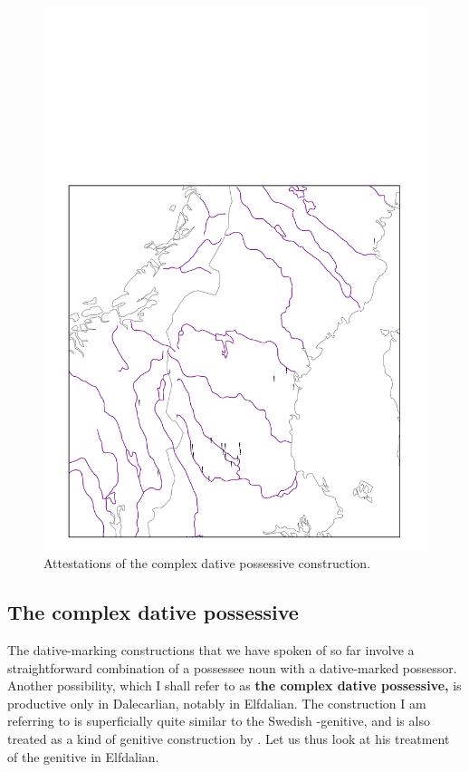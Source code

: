 {\begin{figure}[h]
\includegraphics[height=.3\textheight]{figures/23_Attestationsofthecomplex}
\caption{Attestations of the complex dative possessive construction.}
\label{map:19}

\end{figure}

\subsection{The complex dative possessive}
\label{sec:5.4.2}

The dative-marking constructions that we have spoken of so far involve a straightforward combination of a possessee noun with a dative-marked possessor. Another possibility, which I shall refer to as \textbf{the complex dative possessive,} is productive only in Dalecarlian, notably in Elfdalian. The construction I am referring to is superficially quite similar to the Swedish -genitive, and is also treated as a kind of genitive construction by \citet{Levander1909}. Let us thus look at his treatment of the genitive in Elfdalian.

}
